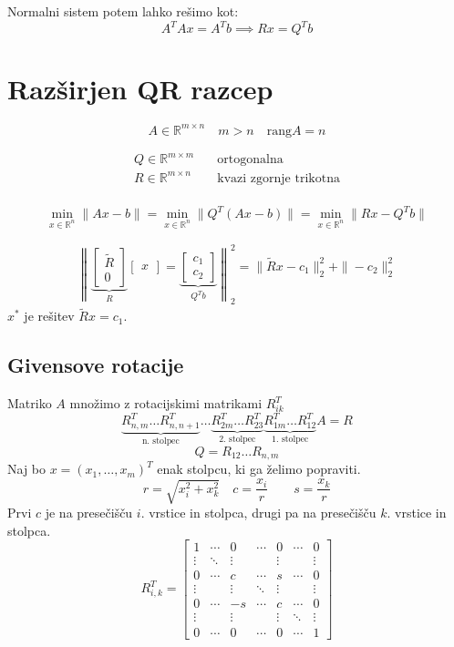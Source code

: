 \begin{multicols}{5}
Normalni sistem potem lahko rešimo kot:
\[ A^TAx = A^Tb \implies Rx = Q^Tb\]

\section{Razširjen QR razcep}
\[ A \in \mathbb{R}^{m\times n} \quad m > n \quad \text{rang}A = n \]

\begin{align*}
	Q \in \mathbb{R}^{m\times m} \quad &\text{ortogonalna } \\
	R \in \mathbb{R}^{m\times n} \quad &\text{kvazi zgornje trikotna} \\
\end{align*}

\[ \scriptstyle \min\limits_{x\in\mathbb{R}^n} \| Ax - b\| = \min\limits_{x\in\mathbb{R}^n} \| Q^T(Ax - b)\| = \min\limits_{x\in\mathbb{R}^n} \| Rx - Q^Tb \| \]

\begin{align*}	
	\left\| \underbrace{\begin{bmatrix}
		\tilde{R} \\ 0
	\end{bmatrix}}_{R}
	\begin{bmatrix}
		x
	\end{bmatrix}
	=
	\underbrace{\begin{bmatrix}
		c_1 \\
		c_2
	\end{bmatrix}}_{Q^T b}
	\right\|^2_2
	= \| \tilde{R}x - c_1 \|^2_2 + \|-c_2\|^2_2
\end{align*}
$x^*$ je rešitev $\tilde{R}x = c_1$.

\subsection{Givensove rotacije}
Matriko $A$ množimo z rotacijskimi matrikami $R_{ik}^T$
\[ \underbrace{R_{n,m}^T \dots  R_{n,n+1}^T}_{\text{n. stolpec}} \dots \underbrace{R_{2m}^T \dots R_{23}^T}_{\text{2. stolpec}} \underbrace{R_{1m}^T \dots R_{12}^T}_{\text{1. stolpec}} A = R\]
\[ Q = R_{12} \dots R_{n,m}\]
Naj bo $x = (x_1, \dots, x_m)^T$ enak stolpcu, ki ga želimo popraviti.
\[ r = \sqrt{x_i^2 + x_k^2} \quad c = \frac{x_i}{r} \qquad s = \frac{x_k}{r}\]
Prvi $c$ je na presečišču $i$. vrstice in stolpca, drugi pa na presečišču $k$. vrstice in stolpca.
\[R_{i,k}^T = \begin{bmatrix}   1   & \cdots &    0   & \cdots &    0   & \cdots &    0   \\
	\vdots & \ddots & \vdots &        & \vdots &        & \vdots \\
	   0   & \cdots &    c   & \cdots &   s   & \cdots &    0   \\
	\vdots &        & \vdots & \ddots & \vdots &        & \vdots \\
	   0   & \cdots &    -s   & \cdots &    c   & \cdots &    0   \\
	\vdots &        & \vdots &        & \vdots & \ddots & \vdots \\
	   0   & \cdots &    0   & \cdots &    0   & \cdots &    1
\end{bmatrix}\]


\end{multicols}
